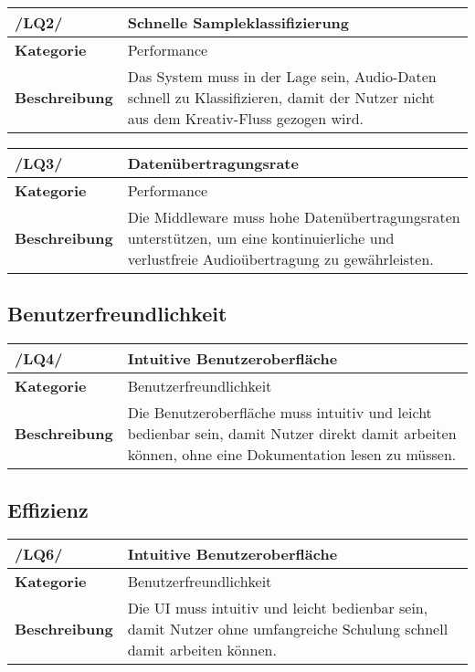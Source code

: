 \begin{table}[h!]
	\begin{tabularx}{\textwidth}{|l|X|}
		\hline
		\textbf{/LQ2/} & \textbf{Schnelle Sampleklassifizierung} \\ \hline
		\textbf{Kategorie} & Performance \\ \hline
		\textbf{Beschreibung} & Das System muss in der Lage sein, Audio-Daten schnell zu Klassifizieren, damit der Nutzer nicht aus dem Kreativ-Fluss gezogen wird. \\ \hline
	\end{tabularx}
\end{table}

\begin{table}[h!]
	\begin{tabularx}{\textwidth}{|l|X|}
		\hline
		\textbf{/LQ3/} & \textbf{Datenübertragungsrate} \\ \hline
		\textbf{Kategorie} & Performance \\ \hline
		\textbf{Beschreibung} & Die Middleware muss hohe Datenübertragungsraten unterstützen, um eine kontinuierliche und verlustfreie Audioübertragung zu gewährleisten. \\ \hline
	\end{tabularx}
\end{table}

\subsection{Benutzerfreundlichkeit}

\begin{table}[h!]
	\begin{tabularx}{\textwidth}{|l|X|}
		\hline
		\textbf{/LQ4/} & \textbf{Intuitive Benutzeroberfläche} \\ \hline
		\textbf{Kategorie} & Benutzerfreundlichkeit \\ \hline
		\textbf{Beschreibung} & Die Benutzeroberfläche muss intuitiv und leicht bedienbar sein, damit Nutzer direkt damit arbeiten können, ohne eine Dokumentation lesen zu müssen. \\ \hline
	\end{tabularx}
\end{table}

\newpage
\subsection{Effizienz}

\begin{table}[h!]
\begin{tabularx}{13cm}{|l|X|}
\hline
\textbf{/LQ6/} & \textbf{Intuitive Benutzeroberfläche} \\ \hline
\textbf{Kategorie} & Benutzerfreundlichkeit \\ \hline
\textbf{Beschreibung} & Die UI muss intuitiv und leicht bedienbar sein, damit Nutzer ohne umfangreiche Schulung schnell damit arbeiten können. \\ \hline
\end{tabularx}
\end{table}


